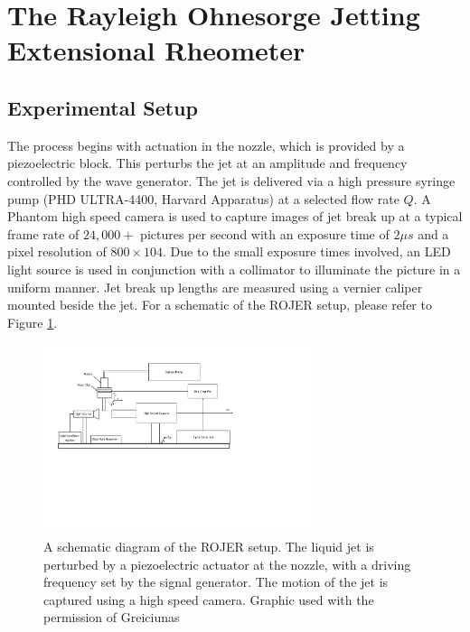 \documentclass[11pt]{article}
\begin{document}
\newpage

\section{The Rayleigh Ohnesorge Jetting Extensional Rheometer}
\subsection{Experimental Setup}
The process begins with actuation in the nozzle, which is provided by a piezoelectric block. This perturbs the jet at an amplitude and frequency controlled by the wave generator. The jet is delivered via a high pressure syringe pump (PHD ULTRA-4400, Harvard Apparatus) at a selected flow rate $Q$. A Phantom high speed camera is used to capture images of jet break up at a typical frame rate of $24,000 +$ pictures per second with an exposure time of $2 \mu s$ and a pixel resolution of $800 \times 104$. Due to the small exposure times involved, an LED light source is used in conjunction with a collimator to illuminate the picture in a uniform manner. Jet break up lengths are measured using a vernier caliper mounted beside the jet. For a schematic of the ROJER setup, please refer to Figure \ref{fig:schematic}. 
\begin{figure}[h]
\begin{center}
	\includegraphics[trim=0cm 9cm 8cm 1.5cm, width = 0.7\textwidth]{img/ROJER_schematic.pdf}
	\caption{A schematic diagram of the ROJER setup. The liquid jet is perturbed by a piezoelectric actuator at the nozzle, with a driving frequency set by the signal generator. The motion of the jet is captured using a high speed camera. Graphic used with the permission of Greiciunas \cite{greiciunas2015report}}
	\label{fig:schematic}
\end{center}
\end{figure}
\end{document}
